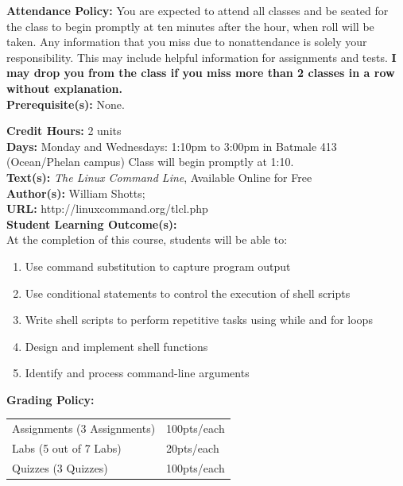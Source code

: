 \documentclass[11pt]{article}
\begin{document}
\textbf {Attendance Policy:} You are expected to attend all classes and be
seated for the class to begin promptly at ten minutes after the hour, when roll
will be taken. Any information that you miss due to nonattendance is solely
your responsibility. This may include helpful information for assignments and
tests. {\bf I may drop you from the class if you miss more than 2 classes in a
row without explanation.}\\

\textbf {Prerequisite(s):} None.

\textbf {Credit Hours:} 2 units\\
\textbf {Days:} Monday and Wednesdays: 1:10pm to 3:00pm in Batmale 413 (Ocean/Phelan campus)
Class will begin promptly at 1:10.\\
\textbf {\large Text(s):} \emph{The Linux Command Line}, Available Online for Free\\
\textbf {Author(s):} William Shotts;\\
\textbf {URL:} http://linuxcommand.org/tlcl.php \\

\textbf {\large Student Learning Outcome(s):} \\
At the completion of this course, students will be able to:
\begin{enumerate} \itemsep-0.4em
  \item Use command substitution to capture program output
  \item Use conditional statements to control the execution of shell scripts
  \item Write shell scripts to perform repetitive tasks using while and for loops
  \item Design and implement shell functions
  \item Identify and process command-line arguments
\end{enumerate}

\textbf {\large Grading Policy:} \\
\hspace*{40mm}
\begin{tabular}{ l l }
Assignments (3 Assignments)& 100pts/each \\
Labs (5 out of 7 Labs)& 20pts/each \\
Quizzes (3 Quizzes)& 100pts/each \\
\end{tabular} \\\\
\end{document}
